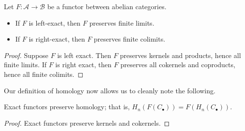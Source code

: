 \documentclass[main.tex]{subfiles}
\begin{document}
\begin{proposition}
  Let $F\colon \mathcal{A} \to \mathcal{B}$ be a functor between abelian categories.
  \begin{itemize}
    \item If $F$ is left-exact, then $F$ preserves finite limits.

    \item If $F$ is right-exact, then $F$ preserves finite colimits.
  \end{itemize}
\end{proposition}
\begin{proof}
  Suppose $F$ is left exact. Then $F$ preserves kernels and products, hence all finite limits. If $F$ is right exact, then $F$ preserves all cokernels and coproducts, hence all finite colimits.
\end{proof}

Our definition of homology now allows us to cleanly note the following.
\begin{proposition}
  Exact functors preserve homology; that is, $H_{n}(F(C_{\bullet})) = F(H_{n}(C_{\bullet}))$.
\end{proposition}
\begin{proof}
  Exact functors preserve kernels and cokernels.
\end{proof}
\end{document}
